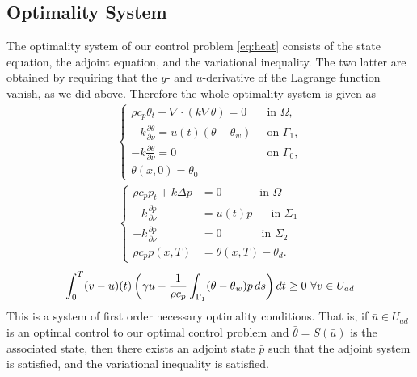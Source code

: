 \subsection{Optimality System}
The optimality system of our control problem \eqref{eq:heat} consists of the state equation, the adjoint equation, and the variational inequality. The two latter are obtained by requiring that the $y$- and $u$-derivative of the Lagrange function vanish, as we did above. Therefore the whole optimality system is given as
%
\begin{align*}
    \begin{cases}
     \rho c_p \theta_t - \nabla \cdot (k \nabla \theta) = 0 \quad & \text{in $\Omega$}, \\
      -k \frac{\partial \theta}{\partial \nu} = u(t) (\theta - \theta_w) &\text{on } \Gamma_1, \\
      -k \frac{\partial \theta}{\partial \nu} = 0  &\text{on } \Gamma_0, \\
      \theta(x, 0) = \theta_0 
      \end{cases}
      \end{align*}
      \begin{align*}
      \begin{cases}
       \rho c_p p_t + k\Delta p &= 0 \quad\qquad\textrm{ in } \Omega \\
      -k\frac{\partial p}{\partial\nu} &= u(t)p \,\,\quad\textrm{ in } \Sigma_1 \\
      -k\frac{\partial p}{\partial\nu} &= 0 \,\quad\qquad\textrm{ in } \Sigma_2 \\
      \rho c_p p(x, T) &= \theta(x, T) - \theta_d.
      \end{cases}
      \end{align*}
\begin{equation*}
       \int_0^T (v - u)(t) \left( \gamma u - \frac{1}{\rho c_p} \int_{\Gamma_1}(\theta - \theta_w)p \mathop{ds} \right) \mathop{dt} \geq 0\ \forall v \in U_{ad}
\end{equation*}
%
This is a system of first order necessary optimality conditions. That is, if $\bar{u} \in U_{ad}$ is an optimal control to our optimal control problem and $\bar{\theta} = S(\bar{u})$ is the associated state, then there exists an adjoint state $\bar{p}$ such that the adjoint system is satisfied, and the variational inequality is satisfied. 



\iffalse
Now one can restate this optimalilty system using the projection formula if one assume box-constraints. That is, if we assume
\begin{equation*}
    U_{\mathrm{ad}} := \{ u \in L^2(\Sigma_1): u_a(x,t) \leq u(x,t) \leq u_b(x,t) \text{ for a.e. } (x,t) \in \Sigma_1 \},
\end{equation*}
then a control $\bar{u} \in U_{\mathrm{ad}}$ and the associated state $\bar{\theta}$ is optimal if and only if it satisfy together with the adjoint state $p$ solving \eqref{eq:adjoint-eqn}  and $\gamma >0$ i.e. the regularisation parameter is positive that
\fi

